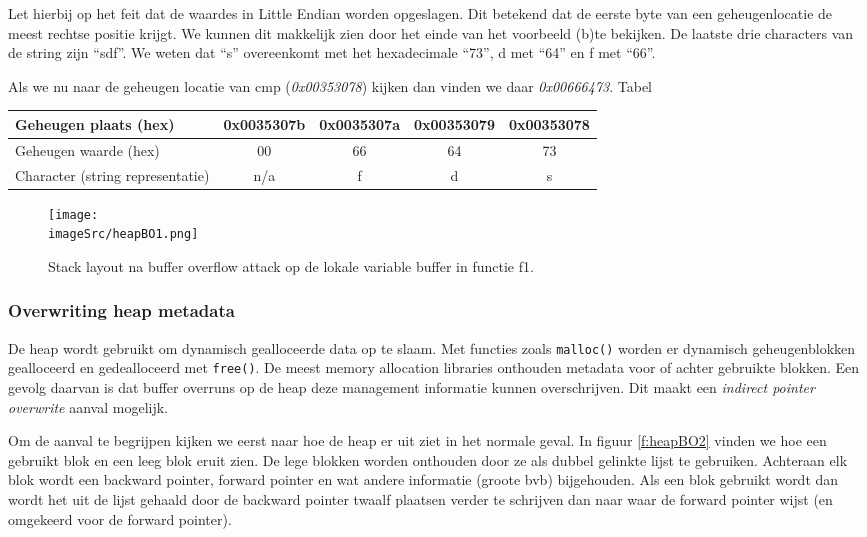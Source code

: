 \documentclass[../main.tex]{subfiles}
\begin{document}
Let hierbij op het feit dat de waardes in Little Endian worden opgeslagen.
Dit betekend dat de eerste byte van een geheugenlocatie de meest rechtse positie krijgt.
We kunnen dit makkelijk zien door het einde van het voorbeeld (b)te bekijken. De laatste drie characters van de string zijn ``sdf''.
We weten dat ``s'' overeenkomt met het hexadecimale ``73'', d met ``64'' en f met ``66''.

Als we nu naar de geheugen locatie van cmp (\emph{0x00353078}) kijken dan vinden we daar \emph{0x00666473}. 
Tabel
\begin{table}
\centering 
\begin{tabular}{l|cccc|}
		Geheugen plaats (hex) & 0x0035307b & 0x0035307a & 0x00353079 & 0x00353078 \\ \hline
		Geheugen waarde (hex) & 00 & 66 & 64 & 73 \\ \hline
		Character (string representatie) & n/a & f & d & s \\ \hline   
\end{tabular}
\end{table}

\begin{figure}
\centering
\texttt{[image: \\imageSrc/heapBO1.png]}
\caption{Stack layout na buffer overflow attack op de lokale variable buffer in functie f1.}
\label{f:heapBO1}
\end{figure}

\subsubsection{Overwriting heap metadata}
De heap wordt gebruikt om dynamisch gealloceerde data op te slaam.
Met functies zoals \lstinline[style=cstyle]{malloc()} worden er dynamisch geheugenblokken gealloceerd en gedealloceerd met \lstinline[style=cstyle]{free()}.
De meest memory allocation libraries onthouden metadata voor of achter gebruikte blokken.
Een gevolg daarvan is dat buffer overruns op de heap deze management informatie kunnen overschrijven.
Dit maakt een \emph{indirect pointer overwrite} aanval mogelijk. 

Om de aanval te begrijpen kijken we eerst naar hoe de heap er uit ziet in het normale geval.
In figuur \ref{f:heapBO2} vinden we hoe een gebruikt blok en een leeg blok eruit zien.
De lege blokken worden onthouden door ze als dubbel gelinkte lijst te gebruiken.
Achteraan elk blok wordt een backward pointer, forward pointer en wat andere informatie (groote bvb) bijgehouden.
Als een blok gebruikt wordt dan wordt het uit de lijst gehaald door de backward pointer twaalf plaatsen verder te schrijven dan naar waar de forward pointer wijst (en omgekeerd voor de forward pointer).
\end{document}
